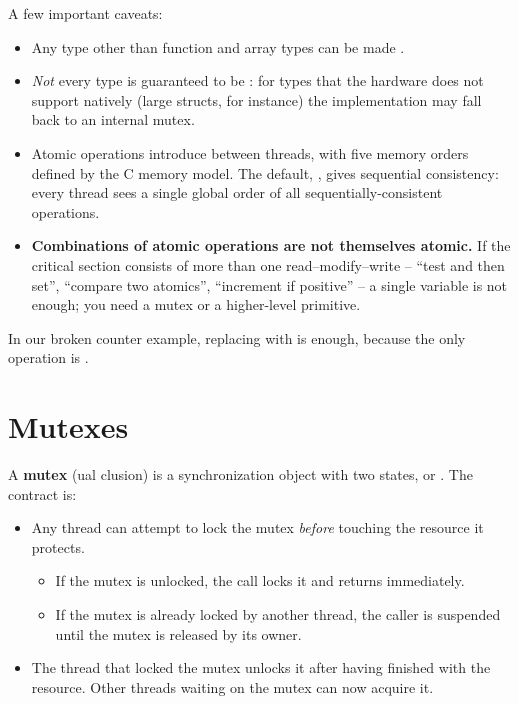 A few important caveats:

\begin{itemize}
    \item Any type other than function and array types can be made .
    \item \emph{Not} every  type is guaranteed to be : for types that the hardware does not support natively (large structs, for instance) the implementation may fall back to an internal mutex.
    \item Atomic operations introduce  between threads, with five memory orders defined by the C memory model. The default, , gives sequential consistency: every thread sees a single global order of all sequentially-consistent operations.
    \item \textbf{Combinations of atomic operations are not themselves atomic.} If the critical section consists of more than one read--modify--write -- ``test and then set'', ``compare two atomics'', ``increment if positive'' -- a single  variable is not enough; you need a mutex or a higher-level primitive.
\end{itemize}

In our broken counter example, replacing  with  is enough, because the only operation is .

\section{Mutexes}

A \textbf{mutex} (ual clusion) is a synchronization object with two states,  or . The contract is:

\begin{itemize}[noitemsep]
    \item Any thread can attempt to lock the mutex \emph{before} touching the resource it protects.
    \begin{itemize}[noitemsep]
        \item If the mutex is unlocked, the call locks it and returns immediately.
        \item If the mutex is already locked by another thread, the caller is suspended until the mutex is released by its owner.
    \end{itemize}
    \item The thread that locked the mutex unlocks it after having finished with the resource. Other threads waiting on the mutex can now acquire it.
\end{itemize}

